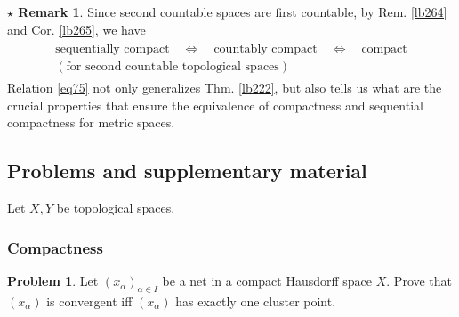 \documentclass[12pt,b5paper,notitlepage]{article}
\theoremstyle{definition}
\newtheorem{srem}[df]{$\star$ Remark}
\newtheorem{prob}{\color{red}Problem}[section]
\theoremstyle{plain}
\numberwithin{equation}{section}
\begin{document}
\begin{srem}
Since second countable spaces are first countable, by Rem. \ref{lb264} and Cor. \ref{lb265}, we have
\begin{gather}\label{eq75}
\begin{gathered}
\text{sequentially compact}\quad\Longleftrightarrow\quad \text{countably compact}\quad\Longleftrightarrow\quad \text{compact}\\[0.5ex]
(\text{for second countable topological spaces})
\end{gathered}
\end{gather}
Relation \eqref{eq75} not only generalizes Thm. \ref{lb222}, but also tells us what are the crucial properties that ensure the equivalence of compactness and sequential compactness for metric spaces. 
\end{srem}






















\subsection{Problems and supplementary material}


Let $X,Y$ be topological spaces.


\subsubsection{Compactness}

\begin{prob}\label{lb237}
Let $(x_\alpha)_{\alpha\in I}$ be a net in a compact Hausdorff space $X$. Prove that $(x_\alpha)$ is convergent iff $(x_\alpha)$ has exactly one cluster point.
\end{prob}
\end{document}
